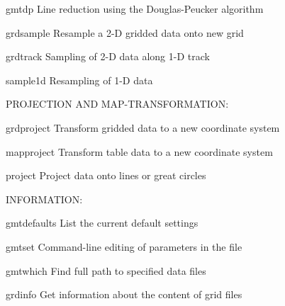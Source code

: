 \documentclass{article}
\begin{document}
\par 	gmtdp		Line reduction using the Douglas-Peucker algorithm\par 

\par 	grdsample	Resample a 2-D gridded data onto new grid\par 

\par 	grdtrack	Sampling of 2-D data along 1-D track\par 

\par 	sample1d	Resampling of 1-D data\par 

\par \par 

\par PROJECTION AND MAP-TRANSFORMATION:\par 

\par 	grdproject	Transform gridded data to a new coordinate system\par 

\par 	mapproject	Transform table data to a new coordinate system\par 

\par 	project	Project data onto lines or great circles\par 

\par \par 

\par INFORMATION:\par 

\par 	gmtdefaults	List the current default settings\par 

\par 	gmtset	Command-line editing of parameters in the  file\par 

\par 	gmtwhich	Find full path to specified data files\par 

\par 	grdinfo	Get information about the content of grid files\par 
\end{document}
